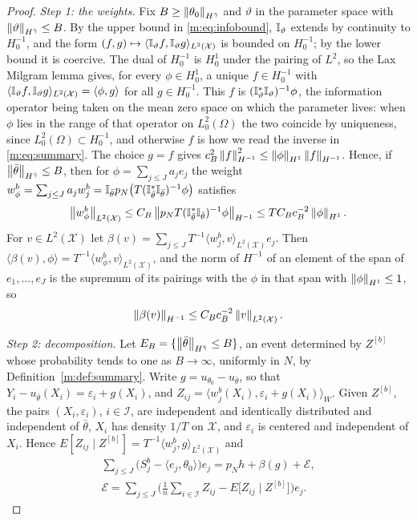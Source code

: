\begin{proof}
\emph{Step 1: the weights.} Fix $B\ge\left\|\theta_0\right\|_{H^{\bar\gamma}}$ and $\vartheta$ in the parameter space with $\left\|\vartheta\right\|_{H^{\bar\gamma}}\le B$. By the upper bound in \eqref{m:eq:infobound}, $\mathbb{I}_\vartheta$ extends by continuity to $H^{-1}_0$, and the form $(f,g)\mapsto\langle\mathbb{I}_\vartheta f,\mathbb{I}_\vartheta g\rangle_{L^2(\mathcal X)}$ is bounded on $H^{-1}_0$; by the lower bound it is coercive. The dual of $H^{-1}_0$ is $H^1_0$ under the pairing of $L^2$, so the Lax Milgram lemma gives, for every $\phi\in H^1_0$, a unique $f\in H^{-1}_0$ with $\langle\mathbb{I}_\vartheta f,\mathbb{I}_\vartheta g\rangle_{L^2(\mathcal X)}=\langle\phi,g\rangle$ for all $g\in H^{-1}_0$. This $f$ is $(\mathbb{I}^*_\vartheta\mathbb{I}_\vartheta)^{-1}\phi$, the information operator being taken on the mean zero space on which the parameter lives: when $\phi$ lies in the range of that operator on $L^2_0(\Omega)$ the two coincide by uniqueness, since $L^2_0(\Omega)\subset H^{-1}_0$, and otherwise $f$ is how we read the inverse in \eqref{m:eq:summary}. The choice $g=f$ gives $c_B^2\left\|f\right\|^2_{H^{-1}}\le\left\|\phi\right\|_{H^1}\left\|f\right\|_{H^{-1}}$. Hence, if $\left\|\bar\theta\right\|_{H^{\bar\gamma}}\le B$, then for $\phi=\sum_{j\le J}a_je_j$ the weight $w^b_\phi=\sum_{j\le J}a_jw^b_j=\mathbb{I}_{\bar\theta}p_N\big(T(\mathbb{I}^*_{\bar\theta}\mathbb{I}_{\bar\theta})^{-1}\phi\big)$ satisfies
\[
\left\|w^b_\phi\right\|_{L^2(\mathcal X)}\le C_B\left\|p_NT(\mathbb{I}^*_{\bar\theta}\mathbb{I}_{\bar\theta})^{-1}\phi\right\|_{H^{-1}}\le TC_Bc_B^{-2}\left\|\phi\right\|_{H^1} .
\]
For $v\in L^2(\mathcal X)$ let $\beta(v)=\sum_{j\le J}T^{-1}\langle w^b_j,v\rangle_{L^2(\mathcal X)}e_j$. Then $\langle\beta(v),\phi\rangle=T^{-1}\langle w^b_\phi,v\rangle_{L^2(\mathcal X)}$, and the norm of $H^{-1}$ of an element of the span of $e_1,\dots,e_J$ is the supremum of its pairings with the $\phi$ in that span with $\left\|\phi\right\|_{H^1}\le1$, so
\[
\left\|\beta(v)\right\|_{H^{-1}}\le C_Bc_B^{-2}\left\|v\right\|_{L^2(\mathcal X)} .
\]

\emph{Step 2: decomposition.} Let $E_B=\{\left\|\bar\theta\right\|_{H^{\bar\gamma}}\le B\}$, an event determined by $Z^{[b]}$ whose probability tends to one as $B\to\infty$, uniformly in $N$, by Definition~\ref{m:def:summary}. Write $g=u_{\theta_0}-u_{\bar\theta}$, so that $Y_i-u_{\bar\theta}(X_i)=\varepsilon_i+g(X_i)$, and $Z_{ij}=\langle w^b_j(X_i),\varepsilon_i+g(X_i)\rangle_W$. Given $Z^{[b]}$, the pairs $(X_i,\varepsilon_i)$, $i\in\mathcal I$, are independent and identically distributed and independent of $\bar\theta$, $X_i$ has density $1/T$ on $\mathcal X$, and $\varepsilon_i$ is centered and independent of $X_i$. Hence $E[Z_{ij}\mid Z^{[b]}]=T^{-1}\langle w^b_j,g\rangle_{L^2(\mathcal X)}$ and
\[
\begin{gathered}
\sum_{j\le J}\big(S^b_j-\langle e_j,\theta_0\rangle\big)e_j=p_Nh+\beta(g)+\mathcal E,\\
\mathcal E=\sum_{j\le J}\Big(\frac1n\sum_{i\in\mathcal I}Z_{ij}-E\big[Z_{ij}\mid Z^{[b]}\big]\Big)e_j .
\end{gathered}
\]


\end{proof}
